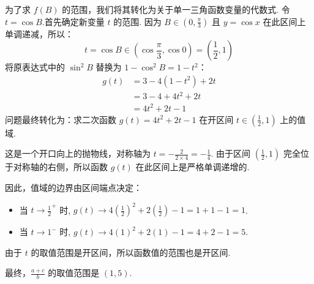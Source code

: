 \begin{solution}
	为了求 $f(B)$ 的范围，我们将其转化为关于单一三角函数变量的代数式.
	令 $t = \cos B$.首先确定新变量 $t$ 的范围.
	因为 $B \in (0, \frac{\pi}{3})$ 且 $y=\cos x$ 在此区间上单调递减，所以：
	\[
	t = \cos B \in \left(\cos\frac{\pi}{3}, \cos 0\right) = \left(\frac{1}{2}, 1\right)
	\]
	将原表达式中的 $\sin^2 B$ 替换为 $1-\cos^2 B = 1-t^2$：
	\begin{align*}
		g(t) &= 3 - 4(1-t^2) + 2t \\
		&= 3 - 4 + 4t^2 + 2t \\
		&= 4t^2 + 2t - 1
	\end{align*}
	问题最终转化为：求二次函数 $g(t) = 4t^2+2t-1$ 在开区间 $t \in (\frac{1}{2}, 1)$ 上的值域.
	
	这是一个开口向上的抛物线，对称轴为 $t = -\frac{2}{2 \times 4} = -\frac{1}{4}$.
	由于区间 $(\frac{1}{2}, 1)$ 完全位于对称轴的右侧，所以函数 $g(t)$ 在此区间上是严格单调递增的.
	
	因此，值域的边界由区间端点决定：
	\begin{itemize}
		\item 当 $t \to \frac{1}{2}^+$ 时, $g(t) \to 4(\frac{1}{2})^2 + 2(\frac{1}{2}) - 1 = 1+1-1=1$.
		\item 当 $t \to 1^-$ 时, $g(t) \to 4(1)^2 + 2(1) - 1 = 4+2-1=5$.
	\end{itemize}
	由于 $t$ 的取值范围是开区间，所以函数值的范围也是开区间.
	
	最终，$\frac{a+c}{b}$ 的取值范围是 $(1, 5)$.\hfill\qedsymbol
\end{solution}

